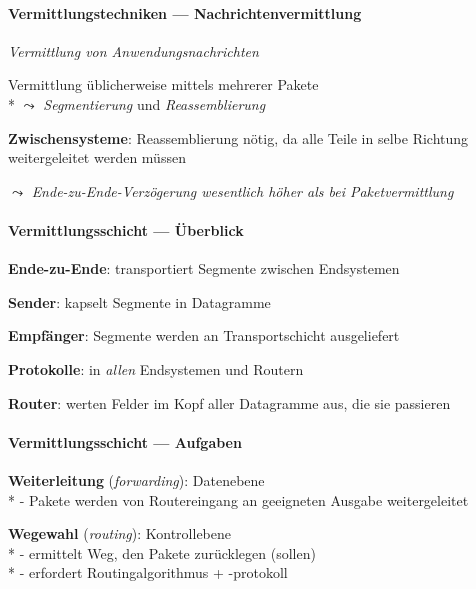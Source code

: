 \paragraph{Vermittlungstechniken --- Nachrichtenvermittlung}
\begin{items}
  \item \emph{Vermittlung von Anwendungsnachrichten}
  \item Vermittlung üblicherweise mittels mehrerer Pakete \\*
    \( \leadsto \) \emph{Segmentierung} und \emph{Reassemblierung}
  \item \textbf{Zwischensysteme}: Reassemblierung nötig, da alle Teile in selbe Richtung weitergeleitet werden müssen
  \item \( \leadsto \) \emph{Ende-zu-Ende-Verzögerung wesentlich höher als bei Paketvermittlung}
\end{items}

\paragraph{Vermittlungsschicht --- Überblick}
\begin{items}
  \item \textbf{Ende-zu-Ende}: transportiert Segmente zwischen Endsystemen
  \item \textbf{Sender}: kapselt Segmente in Datagramme
  \item \textbf{Empfänger}: Segmente werden an Transportschicht ausgeliefert
  \item \textbf{Protokolle}: in \emph{allen} Endsystemen und Routern
  \item \textbf{Router}: werten Felder im Kopf aller Datagramme aus, die sie passieren
\end{items}

\paragraph{Vermittlungsschicht --- Aufgaben}
\begin{items}
  \item \textbf{Weiterleitung} (\emph{forwarding}): Datenebene \\*
    - Pakete werden von Routereingang an geeigneten Ausgabe weitergeleitet
  \item \textbf{Wegewahl} (\emph{routing}): Kontrollebene \\*
    - ermittelt Weg, den Pakete zurücklegen (sollen) \\*
    - erfordert Routingalgorithmus + -protokoll
\end{items}

